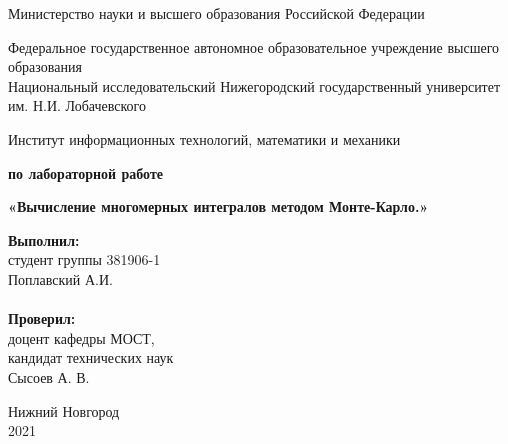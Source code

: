\documentclass{report}
\begin{document}
\begin{titlepage}

\begin{center}
Министерство науки и высшего образования Российской Федерации
\end{center}

\begin{center}
Федеральное государственное автономное образовательное учреждение высшего образования \\
Национальный исследовательский Нижегородский государственный университет им. Н.И. Лобачевского
\end{center}

\begin{center}
Институт информационных технологий, математики и механики
\end{center}

\vspace{4em}

\begin{center}
\textbf{ по лабораторной работе} \\
\end{center}
\begin{center}
\textbf{\Large «Вычисление многомерных интегралов методом Монте-Карло.»}
\vspace{4em}
\end{center}
\newbox{\lbox}
\newlength{\maxl}
\setlength{\maxl}{\wd\lbox}
\hfill\parbox{7cm}{
\hspace*{5cm}\hspace*{-5cm}\textbf{Выполнил:} \\ студент группы 381906-1 \\ Поплавский А.И.\\
\\
\hspace*{5cm}\hspace*{-5cm}\textbf{Проверил:}\\ доцент кафедры МОСТ, \\ кандидат технических наук \\ Сысоев А. В.\\
}
\vspace{\fill}

\begin{center} Нижний Новгород \\ 2021 \end{center}

\end{titlepage}
\end{document}
